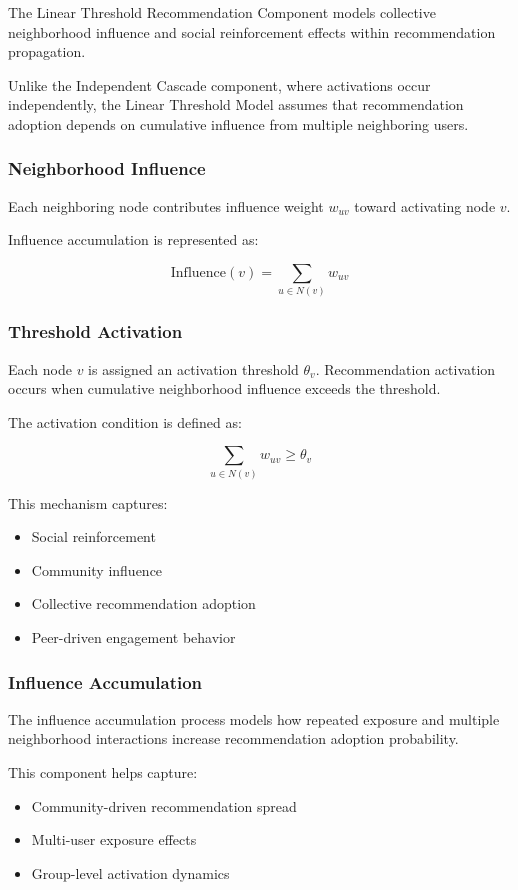 \documentclass{article}
\begin{document}
The Linear Threshold Recommendation Component models collective neighborhood influence and social reinforcement effects within recommendation propagation.

Unlike the Independent Cascade component, where activations occur independently, the Linear Threshold Model assumes that recommendation adoption depends on cumulative influence from multiple neighboring users.

\subsubsection{Neighborhood Influence}

Each neighboring node contributes influence weight $w_{uv}$ toward activating node $v$.

Influence accumulation is represented as:

$$
\text{Influence}(v) = \sum_{u \in N(v)} w_{uv}
$$

\subsubsection{Threshold Activation}

Each node \(v\) is assigned an activation threshold \(\theta_v\). Recommendation activation occurs when cumulative neighborhood influence exceeds the threshold.

The activation condition is defined as:

\[
\sum_{u \in N(v)} w_{uv} \geq \theta_v
\]

This mechanism captures:
\begin{itemize}
\item Social reinforcement
\item Community influence
\item Collective recommendation adoption
\item Peer-driven engagement behavior
\end{itemize}


\subsubsection{Influence Accumulation}

The influence accumulation process models how repeated exposure and multiple neighborhood interactions increase recommendation adoption probability.

This component helps capture:
\begin{itemize}
\item Community-driven recommendation spread
\item Multi-user exposure effects
\item Group-level activation dynamics
\end{itemize}
\end{document}
